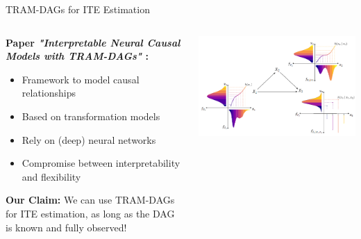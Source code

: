 \documentclass[onlytextwidth,english]{beamer}\usepackage[]{graphicx}\usepackage[]{xcolor}
\begin{document}
\begin{frame}{TRAM-DAGs for ITE Estimation}

\begin{columns}

\begin{column}{0.7\textwidth}

\textbf{Paper \textit{"Interpretable Neural Causal Models with TRAM-DAGs"} \citep{sick2025}:}
\begin{itemize}
    \item Framework to model causal relationships
    \item Based on transformation models
    \item Rely on (deep) neural networks
    \item Compromise between interpretability and flexibility
\end{itemize}

\textbf{Our Claim:} We can use TRAM-DAGs for ITE estimation, as long as the DAG is known and fully observed!

\end{column}

\begin{column}{0.3\textwidth}
\includegraphics[width=\textwidth]{img/TRAM_DAG_Background.png}
\end{column}

\end{columns}

\end{frame}
\end{document}
